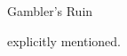 \documentclass[handout]{mcs}
\begin{document}


\begin{staffnotes}
Gambler's Ruin
\end{staffnotes}

explicitly mentioned.

\end{document}
